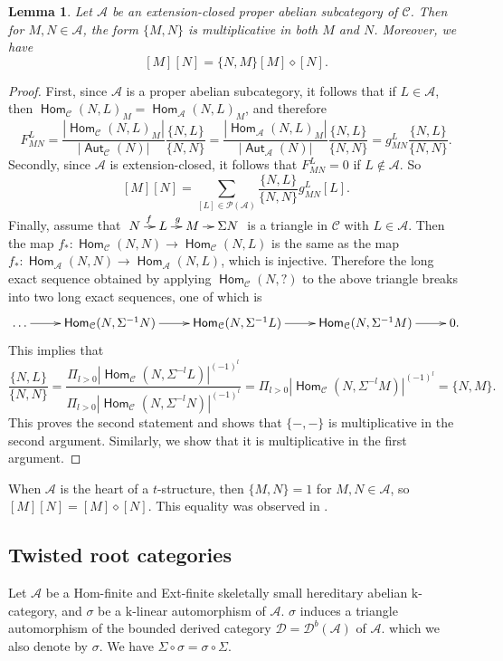 \documentclass[reqno,12pt,a4paper]{amsart}
\newtheorem{lemma}[theorem]{Lemma}
\theoremstyle{remark}
\theoremstyle{definition}
\newcommand{\opname}[1]{\operatorname{\mathsf{#1}}}
\newcommand{\Hom}{\opname{Hom}}
\newcommand{\Aut}{\opname{Aut}}
\newcommand{\ca}{{\mathcal A}}
\newcommand{\cc}{{\mathcal C}}
\newcommand{\cd}{{\mathcal D}}
\newcommand{\cp}{{\mathcal P}}
\newcommand{\fk}{{\mathrm k}}
\numberwithin{equation}{section}
\begin{document}
\begin{lemma}
\label{lem:derived-Hall-number-for-proper-abelian-subcategory}
Let $\ca$ be an extension-closed proper abelian subcategory of $\cc$. 
Then for $M,N\in\ca$, the form $\{M,N\}$ is multiplicative in both $M$ and $N$. Moreover, we have
\[
[M][N]=\{N,M\}[M]\diamond [N].
\]
\end{lemma}
\begin{proof}
First, since $\ca$ is a proper abelian subcategory, it follows that if $L\in\ca$, then $\Hom_\cc(N,L)_M=\Hom_\ca(N,L)_M$, and therefore
\[
F_{MN}^L=\frac{|\Hom_\cc(N,L)_M|}{|\Aut_\cc(N)|}\frac{\{N,L\}}{\{N,N\}}=\frac{|\Hom_\ca(N,L)_M|}{|\Aut_\ca(N)|}\frac{\{N,L\}}{\{N,N\}}=g_{MN}^L\frac{\{N,L\}}{\{N,N\}}.
\]
Secondly, since $\ca$ is extension-closed, it follows that $F_{MN}^L=0$ if $L\not\in\ca$. So
\[
[M][N]=\sum_{[L]\in\cp(\ca)}\frac{\{N,L\}}{\{N,N\}}g_{MN}^L[L].
\]
Finally, assume that $\xymatrix@C=0.7pc{N\ar[r]^f & L\ar[r]^g & M\ar[r] & \Sigma N}$ is a triangle in $\cc$ with $L\in\ca$. Then the map $f_*\colon\Hom_{\cc}(N,N)\to\Hom_{\cc}(N,L)$ is the same as the map $f_*\colon\Hom_{\ca}(N,N)\to\Hom_{\ca}(N,L)$, which is injective. Therefore the long exact sequence obtained by applying $\Hom_\cc(N,?)$ to the above triangle breaks into two long exact sequences, one of which is
\[
\xymatrix@R=1pc{
\ldots\ar[r] & \Hom_\cc(N,\Sigma^{-1} N)\ar[r] & \Hom_\cc(N,\Sigma^{-1}L)\ar[r] & \Hom_\cc(N,\Sigma^{-1}M)\ar[r] & 0.
}
\]
This implies that
\[
\frac{\{N,L\}}{\{N,N\}}=\frac{\Pi_{l>0}|\Hom_\cc(N,\Sigma^{-l}L)|^{(-1)^l}}{\Pi_{l>0}|\Hom_\cc(N,\Sigma^{-l}N)|^{(-1)^l}}=\Pi_{l>0}|\Hom_\cc(N,\Sigma^{-l}M)|^{(-1)^l}=\{N,M\}.
\]
This proves the second statement and shows that $\{-,-\}$ is multiplicative in the second argument.
Similarly, we show that it is multiplicative in the first argument.
\end{proof}


When $\ca$ is the heart of a $t$-structure, then $\{M,N\}=1$ for $M,N\in\ca$, so $[M][N]=[M]\diamond[N]$. This equality was observed in \cite[Section 6]{Toen06}.


\subsection{Twisted root categories}
\label{ss:twisted-root-category}
Let $\mathcal{A}$ be a Hom-finite and Ext-finite skeletally small hereditary abelian $\fk$-category, and $\sigma$ be a $\fk$-linear automorphism of $\mathcal{A}$. $\sigma$ induces a triangle automorphism of the bounded derived category $\mathcal{D}=\cd^b(\mathcal{A})$ of $\mathcal{A}$. which we also denote by $\sigma$. We have $\Sigma\circ \sigma=\sigma\circ\Sigma$.
\end{document}
